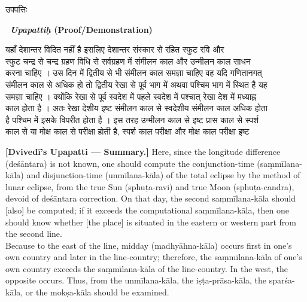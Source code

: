 \documentclass[11pt,a4paper]{article}
\newcommand{\dev}[1]{{\devanagarifont #1}}
\newcommand{\bilingualpair}[2]{%
  \noindent%
  \begin{minipage}[t]{0.48\textwidth}
    #1%
  \end{minipage}%
  \hfill%
  \begin{minipage}[t]{0.48\textwidth}
    #2%
  \end{minipage}%
  \par\vspace{0.5em}%
}
\newenvironment{sanskritcol}{\devanagarifont\small}{}
\newenvironment{englishcol}{\iastfont\small}{}
\begin{document}
\newpage

\bilingualpair{%
\begin{sanskritcol}
\dev{उपपत्तिः}
\end{sanskritcol}%
}{%
\begin{englishcol}
\textbf{\textbar\ \textit{Upapattiḥ} (Proof/Demonstration)}
\end{englishcol}%
}

\bilingualpair{%
\begin{sanskritcol}
\dev{यहाँ देशान्तर विदित नहीं है इसलिए देशान्तर संस्कार से रहित स्फुट रवि और}\\[0.3em]
\dev{स्फुट चन्द्र से चन्द्र ग्रहण विधि से सर्वग्रहण में संमीलन काल और उन्मीलन काल साधन}\\[0.3em]
\dev{करना चाहिए । उस दिन में द्वितीय से भी संमीलन काल समज्ञा चाहिए वह यदि गणितानगत्}\\[0.3em]
\dev{संमीलन काल से अधिक हो तो द्वितीय रेखा से पूर्व भाग में अथवा पश्चिम भाग में स्थित है यह}\\[0.3em]
\dev{समज्ञा चाहिए । क्योंकि रेखा से पूर्व स्वदेश में पहले स्वदेश में पश्चात् रेखा देश में मध्याह्न}\\[0.3em]
\dev{काल होता है । अतः रेखा देशीय इष्ट संमीलन काल से स्वदेशीय संमीलन काल अधिक होता}\\[0.3em]
\dev{है पश्चिम में इसके विपरीत होता है । इस तरह उन्मीलन काल से इष्ट प्रास काल से स्पर्श}\\[0.3em]
\dev{काल से या मोक्ष काल से परीक्षा होती है, स्पर्श काल परीक्षा और मोक्ष काल परीक्षा इष्ट}
\end{sanskritcol}%
}{%
\begin{englishcol}
\textbf{[Dvivedī's Upapatti --- Summary.]} Here, since the longitude difference (deśāntara) is not known, one should compute the conjunction-\-time (saṃmīlana-kāla) and disjunction-\-time (unmīlana-kāla) of the total eclipse by the method of lunar eclipse, from the true Sun (sphuṭa-ravi) and true Moon (sphuṭa-candra), devoid of deśāntara correction. On that day, the second saṃmīlana-kāla should [also] be computed; if it exceeds the computational saṃmīlana-kāla, then one should know whether [the place] is situated in the eastern or western part from the second line.\\[0.3em]
Because to the east of the line, midday (madhyāhna-kāla) occurs first in one's own country and later in the line-country; therefore, the saṃmīlana-kāla of one's own country exceeds the saṃmīlana-kāla of the line-country. In the west, the opposite occurs. Thus, from the unmīlana-kāla, the iṣṭa-prāsa-kāla, the sparśa-kāla, or the mokṣa-kāla should be examined.
\end{englishcol}%
}
\end{document}

